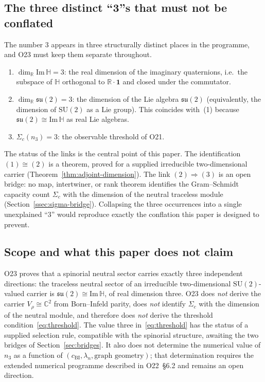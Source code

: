\documentclass[11pt,a4paper]{article}
\newcommand{\ImH}{\mathrm{Im}\,\mathbb{H}}
\newcommand{\su}{\mathfrak{su}}
\newcommand{\SU}{\mathrm{SU}}
\begin{document}
  \subsection{The three distinct ``3''s that must not be conflated}
    \label{ssec:three-threes}

    The number $3$ appears in three structurally distinct places in the programme, and
    O23 must keep them separate throughout.

    \begin{enumerate}
      \item $\dim_{\mathbb{R}} \ImH = 3$: the real dimension of the imaginary quaternions,
      i.e.\ the subspace of $\mathbb{H}$ orthogonal to $\mathbb{R} \cdot \mathbf{1}$ and
      closed under the commutator.

      \item $\dim_{\mathbb{R}} \su(2) = 3$: the dimension of the Lie algebra $\su(2)$
      (equivalently, the dimension of $\SU(2)$ as a Lie group).
      This coincides with~(1) because $\su(2) \cong \ImH$ as real Lie algebras.

      \item $\Sigma_{c}(n_{3}) = 3$: the observable threshold of O21.
    \end{enumerate}

    The status of the links is the central point of this paper.
    The identification $(1) \cong (2)$ is a theorem, proved for a supplied irreducible
    two-dimensional carrier (Theorem~\ref{thm:adjoint-dimension}).
    The link $(2) \Rightarrow (3)$ is an open bridge: no map, intertwiner, or rank theorem
    identifies the Gram--Schmidt capacity count $\Sigma_{c}$ with the dimension of the
    neutral traceless module (Section~\ref{ssec:sigma-bridge}).
    Collapsing the three occurrences into a single unexplained ``$3$'' would reproduce
    exactly the conflation this paper is designed to prevent.

  \subsection{Scope and what this paper does not claim}
    \label{ssec:scope}

    O23 proves that a spinorial neutral sector carries exactly three independent
    directions: the traceless neutral sector of an irreducible two-dimensional
    $\SU(2)$-valued carrier is $\su(2) \cong \ImH$, of real dimension three.
    O23 does \emph{not} derive the carrier $V_{\rho} \cong \mathbb{C}^{2}$ from
    Born--Infeld parity, does \emph{not} identify $\Sigma_{c}$ with the dimension of the
    neutral module, and therefore does \emph{not} derive the threshold
    condition~\eqref{eq:threshold}.
    The value three in~\eqref{eq:threshold} has the status of a supplied selection rule,
    compatible with the spinorial structure, awaiting the two bridges of
    Section~\ref{sec:bridges}.
    It also does not determine the numerical value of $n_{3}$ as a function of
    $(c_{\mathrm{BI}}, \lambda_{n}, \text{graph geometry})$; that determination requires
    the extended numerical programme described in O22~§6.2 and remains an open direction.
\end{document}
